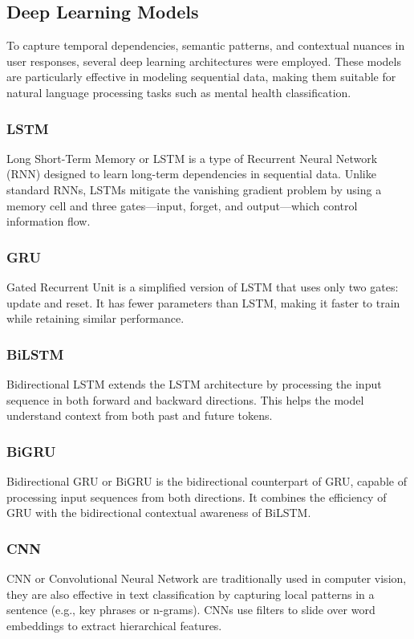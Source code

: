 \subsection{Deep Learning Models}
To capture temporal dependencies, semantic patterns, and contextual nuances in user responses, several deep learning architectures were employed. These models are particularly effective in modeling sequential data, making them suitable for natural language processing tasks such as mental health classification.

\subsubsection{LSTM} Long Short-Term Memory or LSTM is a type of Recurrent Neural Network (RNN) designed to learn long-term dependencies in sequential data. Unlike standard RNNs, LSTMs mitigate the vanishing gradient problem by using a memory cell and three gates—input, forget, and output—which control information flow.

\subsubsection{GRU} Gated Recurrent Unit is a simplified version of LSTM that uses only two gates: update and reset. It has fewer parameters than LSTM, making it faster to train while retaining similar performance.

\subsubsection{BiLSTM} Bidirectional LSTM extends the LSTM architecture by processing the input sequence in both forward and backward directions. This helps the model understand context from both past and future tokens.

\subsubsection{BiGRU} Bidirectional GRU or BiGRU is the bidirectional counterpart of GRU, capable of processing input sequences from both directions. It combines the efficiency of GRU with the bidirectional contextual awareness of BiLSTM.

\subsubsection{CNN} CNN or Convolutional Neural Network are traditionally used in computer vision, they are also effective in text classification by capturing local patterns in a sentence (e.g., key phrases or n-grams). CNNs use filters to slide over word embeddings to extract hierarchical features.


